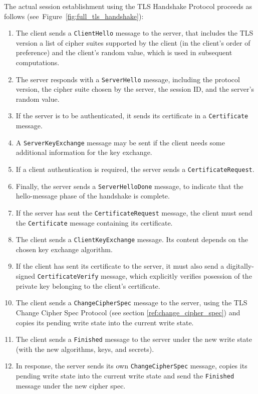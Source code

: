     \noindent The actual session establishment using the TLS Handshake Protocol
    proceeds as follows (see~Figure~\ref{fig:full_tls_handshake}):
    \begin{enumerate}
        \item The client sends a \texttt{ClientHello} message to the server, that
              includes the TLS version a list of cipher suites supported by the
              client (in the client's order of preference) and the client's
              random value, which is used in subsequent computations.
        \item The server responds with a \texttt{ServerHello} message, including
              the protocol version, the cipher suite chosen by the server, the session ID,
              and the server's random value.
        \item If the server is to be authenticated, it sends its certificate in
              a \texttt{Certificate} message.
        \item A \texttt{ServerKeyExchange} message may be sent if the client
              needs some additional information for the key exchange.
        \item If a client authentication is required, the server sends a
              \texttt{CertificateRequest}.
        \item Finally, the server sends a \texttt{ServerHelloDone} message, to
              indicate that the hello-message phase of the handshake is complete.
        \item If the server has sent the \texttt{CertificateRequest} message, the
              client must send the \texttt{Certificate} message containing its
              certificate.
        \item The client sends a \texttt{ClientKeyExchange} message. Its content
              depends on the chosen key exchange algorithm.
        \item If the client has sent its certificate to the server, it must also
              send a digitally-signed \texttt{CertificateVerify} message, which
              explicitly verifies posession of the private key belonging to the
              client's certificate.
        \item The client sends a \texttt{ChangeCipherSpec} message to the server,
              using the TLS Change Cipher Spec Protocol (see
              section \ref{ref:change_cipher_spec}) and copies its pending write state
              into the current write state.
        \item The client sends a \texttt{Finished} message to the server under
              the new write state (with the new algorithms, keys, and secrets).
        \item In response, the server sends its own \texttt{ChangeCipherSpec}
              message, copies its pending write state into the current write
              state and send the \texttt{Finished} message under the new cipher
              spec.
    \end{enumerate}

